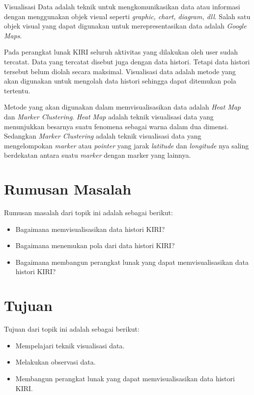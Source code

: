 \documentclass[a4paper,twoside]{article}
\begin{document}
Visualisasi Data adalah teknik  untuk mengkomunikasikan data atau informasi dengan menggunakan objek visual  seperti \textit{graphic, chart, diagram, dll}. Salah satu objek visual yang dapat digunakan untuk merepresentasikan data adalah \textit{Google Maps}.

Pada perangkat lunak KIRI seluruh aktivitas yang dilakukan oleh user sudah tercatat. Data yang tercatat disebut juga dengan data histori. Tetapi data histori tersebut belum diolah secara maksimal. Visualisasi data  adalah metode yang akan digunakan untuk mengolah data histori sehingga dapat ditemukan pola tertentu.

Metode yang akan digunakan dalam memvisualisasikan data adalah \textit{Heat Map } dan \textit{Marker Clustering}. \textit{Heat Map} adalah teknik visualisasi data yang menunjukkan besarnya suatu fenomena sebagai warna dalam dua dimensi. Sedangkan \textit{Marker Clustering}  adalah teknik visualisasi data  yang  mengelompokan \textit{marker} atau \textit{pointer} yang jarak \textit{latitude} dan \textit{longitude} nya saling berdekatan antara suatu \textit{marker} dengan marker yang lainnya.
\section{Rumusan Masalah}
Rumusan masalah dari topik ini adalah sebagai berikut:
\begin{itemize}
  \item Bagaimana memvisualisasikan data histori KIRI?
  \item Bagaimana menemukan pola dari data histori KIRI?
  \item Bagaimana membangun perangkat lunak yang dapat memvisualisasikan data histori KIRI?

\end{itemize}


\section{Tujuan}
Tujuan dari topik ini adalah sebagai berikut:
\begin{itemize}
  \item Mempelajari teknik visualisasi data.
  \item Melakukan observasi data.
  \item Membangun perangkat lunak yang dapat memvisualisasikan data histori KIRI.

\end{itemize}
\end{document}
